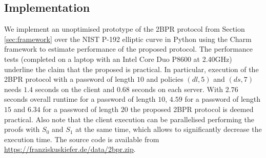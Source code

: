\subsection{Implementation}

We implement an unoptimised prototype of the 2BPR protocol from Section \ref{sec:framework} over the NIST P-192 elliptic curve \cite{nist} in Python using the Charm framework \cite{charm13} to estimate performance of the proposed protocol.
The performance tests (completed on a laptop with an Intel Core Duo P8600 at 2.40GHz) underline the claim that the proposed is practical.
In particular, execution of the 2BPR protocol with a password of length $10$ and policies $(dl, 5)$ and $(ds, 7)$ needs $1.4$ seconds on the client and $0.68$ seconds on each server.
With $2.76$ seconds overall runtime for a password of length $10$, $4.59$ for a password of length $15$ and $6.34$ for a password of length $20$ the proposed 2BPR protocol is deemed practical.
Also note that the client execution can be parallelised performing the proofs with $S_0$ and $S_1$ at the same time, which allows to significantly decrease the execution time.
The source code is available from \url{https://franziskuskiefer.de/data/2bpr.zip}.
